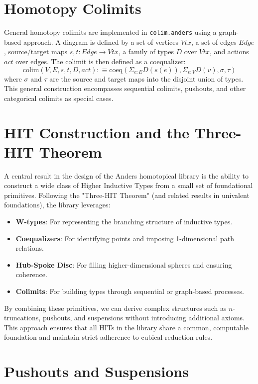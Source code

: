 \documentclass[11pt]{article}
\begin{document}
\section{Homotopy Colimits}

General homotopy colimits are implemented in \texttt{colim.anders} using a graph-based approach. A diagram is defined by a set of vertices $Vtx$, a set of edges $Edge$, source/target maps $s, t : Edge \to Vtx$, a family of types $D$ over $Vtx$, and actions $act$ over edges. The colimit is then defined as a coequalizer:
\begin{equation}
    \text{colim}(V, E, s, t, D, act) :\equiv \text{coeq}(\Sigma_{e:E} D(s(e)), \Sigma_{v:V} D(v), \sigma, \tau)
\end{equation}
where $\sigma$ and $\tau$ are the source and target maps into the disjoint union of types. This general construction encompasses sequential colimits, pushouts, and other categorical colimits as special cases.

\section{HIT Construction and the Three-HIT Theorem}

A central result in the design of the Anders homotopical library is the ability to construct a wide class of Higher Inductive Types from a small set of foundational primitives. Following the "Three-HIT Theorem"
\cite{ThreeHIT} (and related results in univalent foundations), the library leverages:
\begin{itemize}
    \item \textbf{W-types}: For representing the branching structure of inductive types.
    \item \textbf{Coequalizers}: For identifying points and imposing 1-dimensional path relations.
    \item \textbf{Hub-Spoke Disc}: For filling higher-dimensional spheres and ensuring coherence.
    \item \textbf{Colimits}: For building types through sequential or graph-based processes.
\end{itemize}
By combining these primitives, we can derive complex structures such as $n$-truncations, pushouts, and suspensions without introducing additional axioms. This approach ensures that all HITs in the library share a common, computable foundation and maintain strict adherence to cubical reduction rules.

\newpage
\section{Pushouts and Suspensions}
\end{document}
